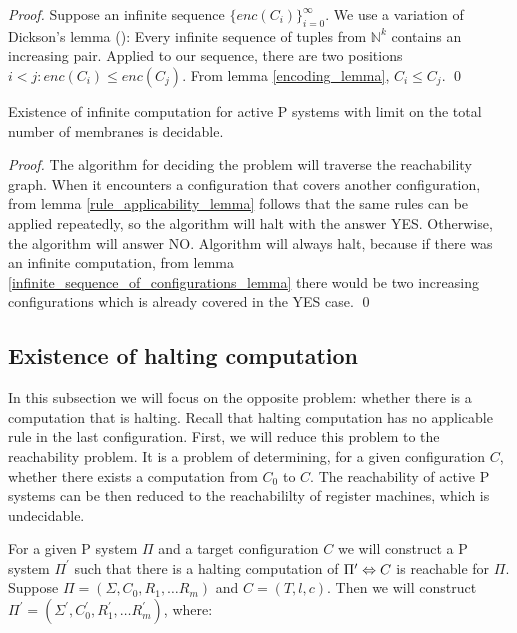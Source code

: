 \documentclass[llncs,submission,copyright,creativecommons]{../lib/lncs/llncs}
\begin{document}
\begin{proof}
  Suppose an infinite sequence $\{enc(C_i)\}_{i=0}^\infty$. We use a variation of Dickson's lemma (\cite{Figueira11Dickson}): Every infinite sequence of tuples from $\mathbb N^k$ contains an increasing pair. Applied to our sequence, there are two positions $i<j: enc(C_i)\leq enc(C_j)$. From lemma \ref{encoding_lemma}, $C_i\leq C_j$.
  \qed
\end{proof}

\begin{theorem}
  Existence of infinite computation for active P systems with limit on the total number of membranes is decidable.
\end{theorem}

\begin{proof}
  The algorithm for deciding the problem will traverse the reachability graph. When it encounters a configuration that covers another configuration, from lemma \ref{rule_applicability_lemma} follows that the same rules can be applied repeatedly, so the algorithm will halt with the answer YES.
  Otherwise, the algorithm will answer NO.
  Algorithm will always halt, because if there was an infinite computation, from lemma \ref{infinite_sequence_of_configurations_lemma} there would be two increasing configurations which is already covered in the YES case.
  \qed
\end{proof}


\subsection{Existence of halting computation} %
\label{sub:existence_of_halting_computation}

In this subsection we will focus on the opposite problem: whether there is a computation that is halting. Recall that halting computation has no applicable rule in the last configuration.
First, we will reduce this problem to the reachability problem. It is a problem of determining, for a given configuration $C$, whether there exists a computation from $C_0$ to $C$. The reachability of active P systems can be then reduced to the reachabililty of register machines, which is undecidable.

For a given P system $\Pi$ and a target configuration $C$ we will construct a P system $\Pi^\prime$ such that there is a halting computation of $\Pi^\prime\Leftrightarrow\linebreak C$ is reachable for $\Pi$. Suppose $\Pi = (\Sigma, C_0, R_1, \dots R_m)$ and $C = (T, l, c)$. Then we will construct $\Pi^\prime = (\Sigma^\prime, C_0^\prime, R_1^\prime, \dots R_m^\prime)$, where:
\end{document}
